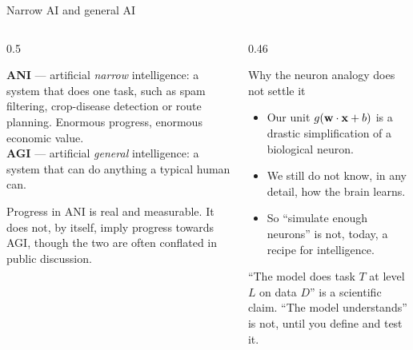 \documentclass[aspectratio=169,10pt]{beamer}
\begin{document}
\begin{frame}{Narrow AI and general AI}
  \begin{columns}[T,onlytextwidth]
    \begin{column}{0.5\textwidth}
      \begin{defnbox}
        \small
        \textbf{ANI} --- artificial \emph{narrow} intelligence: a system that does one task,
        such as spam filtering, crop-disease detection or route planning. Enormous progress,
        enormous economic value.\\[3pt]
        \textbf{AGI} --- artificial \emph{general} intelligence: a system that can do
        anything a typical human can.
      \end{defnbox}
      \footnotesize
      Progress in ANI is real and measurable. It does not, by itself, imply progress
      towards AGI, though the two are often conflated in public discussion.
    \end{column}
    \begin{column}{0.46\textwidth}
      \begin{block}{Why the neuron analogy does not settle it}
        \footnotesize
        \begin{itemize}
          \item Our unit $g(\mathbf{w}\cdot\mathbf{x}+b)$ is a drastic simplification of a biological
                neuron.
          \item We still do not know, in any detail, how the brain learns.
          \item So ``simulate enough neurons'' is not, today, a recipe for intelligence.
        \end{itemize}
      \end{block}
      \begin{pitfall}
        \footnotesize ``The model does task $T$ at level $L$ on data $D$'' is a scientific
        claim. ``The model understands'' is not, until you define and test it.
      \end{pitfall}
    \end{column}
  \end{columns}
\end{frame}
\end{document}
